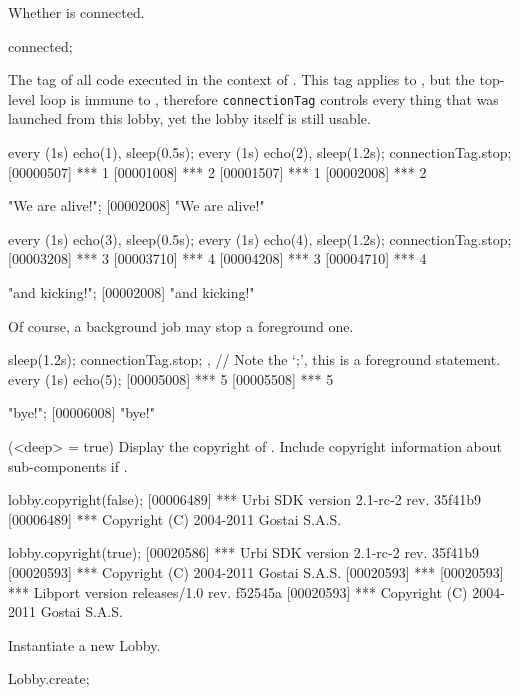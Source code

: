 \begin{urbiscriptapi}
\item[connected]
  Whether \this is connected.
\begin{urbiassert}
connected;
\end{urbiassert}

\item[connectionTag] The tag of all code executed in the context of \this.
  This tag applies to \this, but the top-level loop is immune to
  , therefore \lstinline|connectionTag| controls every
  thing that was launched from this lobby, yet the lobby itself is still
  usable.
\begin{urbiscript}
every (1s) echo(1), sleep(0.5s); every (1s) echo(2),
sleep(1.2s);
connectionTag.stop;
[00000507] *** 1
[00001008] *** 2
[00001507] *** 1
[00002008] *** 2

"We are alive!";
[00002008] "We are alive!"

every (1s) echo(3), sleep(0.5s); every (1s) echo(4),
sleep(1.2s);
connectionTag.stop;
[00003208] *** 3
[00003710] *** 4
[00004208] *** 3
[00004710] *** 4

"and kicking!";
[00002008] "and kicking!"
\end{urbiscript}

  Of course, a background job may stop a foreground one.
\begin{urbiscript}
{ sleep(1.2s); connectionTag.stop; },
// Note the `;', this is a foreground statement.
every (1s) echo(5);
[00005008] *** 5
[00005508] *** 5

"bye!";
[00006008] "bye!"
\end{urbiscript}

\item[copyright](<deep> = true)%
  Display the copyright of \usdk.  Include copyright information
  about sub-components if .
\begin{urbiscript}
lobby.copyright(false);
[00006489] *** Urbi SDK version 2.1-rc-2 rev. 35f41b9
[00006489] *** Copyright (C) 2004-2011 Gostai S.A.S.

lobby.copyright(true);
[00020586] *** Urbi SDK version 2.1-rc-2 rev. 35f41b9
[00020593] *** Copyright (C) 2004-2011 Gostai S.A.S.
[00020593] ***
[00020593] *** Libport version releases/1.0 rev. f52545a
[00020593] *** Copyright (C) 2004-2011 Gostai S.A.S.
\end{urbiscript}

\item[create]
  Instantiate a new Lobby.
\begin{urbiassert}
Lobby.create;
\end{urbiassert}


\end{urbiscriptapi}
